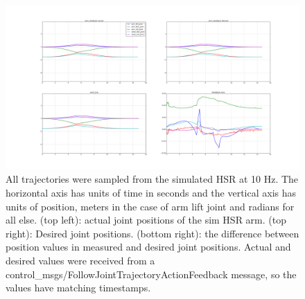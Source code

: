 \documentclass[12pt]{article}
\begin{document}
        \begin{figure}
            \includegraphics[width=\linewidth]{2020.04.02/positions.png}
            \centering
            \caption{All trajectories were sampled from the simulated HSR at 10 Hz. The horizontal axis has units of time in seconds and the vertical axis has units of position, meters in the case of arm lift joint and radians for all else. (top left): actual joint positions of the sim HSR arm. (top right): Desired joint positions. (bottom right): the difference between position values in measured and desired joint positions. Actual and desired values were received from a control\_msgs/FollowJointTrajectoryActionFeedback message, so the values have matching timestamps.}
            \label{fig:posAccuracy}
        \end{figure}
\end{document}
